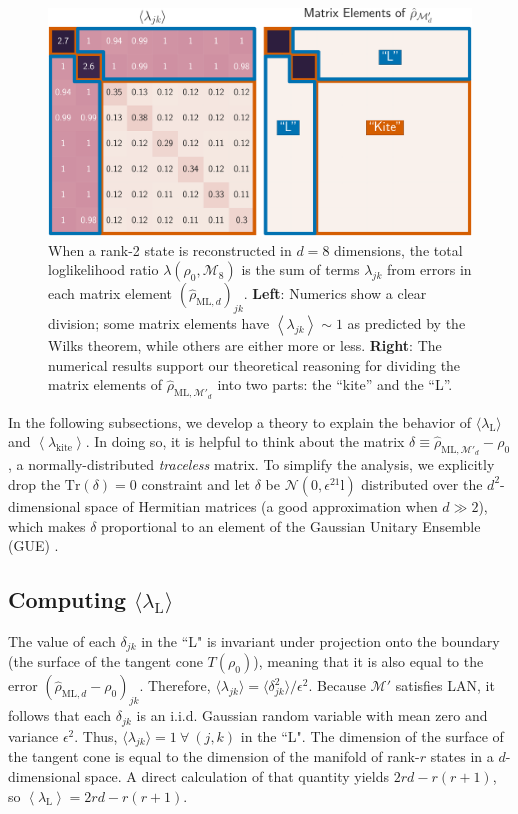 \documentclass[aps,pra, twocolumn]{revtex4-1}
\newcommand{\M}{\mathcal{M}}
\newcommand{\Tr}{\mathrm{Tr}}
\newcommand{\Id}{\mathbb{I}}
\newcommand{\expect}[1]{\ensuremath{\left\langle#1\right\rangle}}
\def\Id{1\!\mathrm{l}}
\newcommand{\rhohat}{\hat{\rho}}
\newcommand{\rhoML}[1]{\rhohat_{\scriptscriptstyle{\mathrm{ML},#1}}}
\begin{document}
\begin{figure}
\includegraphics[width=\columnwidth]{Images/Figure_6.pdf}
 \caption{When a rank-2 state is reconstructed in $d=8$ dimensions, the total loglikelihood ratio $\lambda(\rho_0,\mathcal{M}_8)$ is the sum of terms $\lambda_{jk}$ from errors in each matrix element $(\rhoML{d})_{jk}$.  \textbf{Left}:  Numerics show a clear division; some matrix elements have $\expect{\lambda_{jk}}\sim1$ as predicted by the Wilks theorem, while others are either more or less. \textbf{Right}:  The numerical results support our theoretical reasoning for dividing the matrix elements of $\rhoML{\M'_{d}}$ into two parts: the ``kite'' and the ``L''.}
\label{fig:L}
\end{figure}

In the following subsections, we develop a theory to explain the behavior of $\langle \lambda_{\mathrm{L}}\rangle$ and \expect{\lambda_{\mathrm{kite}}}.
In doing so, it is helpful to think about the matrix $\delta \equiv \rhoML{\M'_{d}}- \rho_{0}$, a normally-distributed \emph{traceless} matrix.  To simplify the analysis, we explicitly drop the $\Tr(\delta)=0$ constraint and let $\delta$ be $\mathcal{N}(0,\epsilon^2\Id)$ distributed over the $d^2$-dimensional space of Hermitian matrices (a good approximation when $d\gg2$), which makes $\delta$ proportional to an element of the Gaussian Unitary Ensemble (GUE) \cite{Fyodorov2005}.

\subsection{Computing $\langle \lambda_\mathrm{L}\rangle$}
\label{subsec:L}
The value of each $\delta_{jk}$ in the ``L" is invariant under projection onto the boundary (the surface of the tangent cone $T(\rho_{0})$), meaning that it is also equal to the error $(\rhoML{d} - \rho_{0})_{jk}$. Therefore,  $\langle \lambda_{jk} \rangle = \langle \delta_{jk}^{2}\rangle /\epsilon^{2}$. Because $\M'$ satisfies LAN, it follows that each $\delta_{jk}$ is an i.i.d. Gaussian random variable with mean zero and variance $\epsilon^{2}$. Thus, $\langle \lambda_{jk}\rangle = 1~\forall~(j,k)$ in the ``L". The dimension of the surface of the tangent cone is equal to the dimension of the manifold of rank-$r$ states in a $d$-dimensional space. A direct calculation of that quantity yields $2rd - r(r+1)$, so $\expect{\lambda_{\mathrm{L}}} = 2rd - r(r+1)$.
\end{document}

